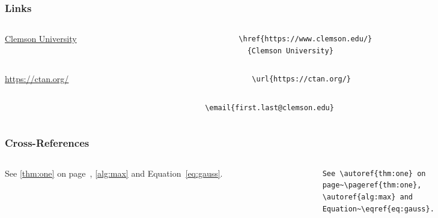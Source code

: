 \documentclass{ltx-talk}
\begin{document}
\begin{frame*}
  \frametitle{Links}
  \begin{columns}
    \begin{column}{.34\textwidth}
      \href{https://www.clemson.edu/}{Clemson University}
    \end{column}
    \begin{column}{.44\textwidth}
\small
\begin{verbatim}
\href{https://www.clemson.edu/}
  {Clemson University}
\end{verbatim}
    \end{column}
  \end{columns}

  \begin{columns}
    \begin{column}{.34\textwidth}
      \url{https://ctan.org/}
    \end{column}
    \begin{column}{.44\textwidth}
\small
\begin{verbatim}
\url{https://ctan.org/}
\end{verbatim}
    \end{column}
  \end{columns}

  \begin{columns}
    \begin{column}{.34\textwidth}
    \end{column}
    \begin{column}{.44\textwidth}
\small
\begin{verbatim}
\email{first.last@clemson.edu}
\end{verbatim}
    \end{column}
  \end{columns}
\end{frame*}

\begin{frame*}
  \frametitle{Cross-References}
  \begin{columns}
    \begin{column}{.34\textwidth}
      See \autoref{thm:one} on page~\pageref{thm:one}, \autoref{alg:max} and
      Equation~\eqref{eq:gauss}.
    \end{column}
    \begin{column}{.44\textwidth}
\small
\begin{verbatim}
See \autoref{thm:one} on
page~\pageref{thm:one},
\autoref{alg:max} and
Equation~\eqref{eq:gauss}.
\end{verbatim}
    \end{column}
  \end{columns}
\end{frame*}
\end{document}
